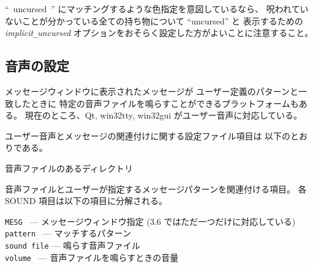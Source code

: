 ``~uncursed~'' にマッチングするような色指定を意図しているなら、
呪われていないことが分かっている全ての持ち物について ``uncursed'' と
表示するための
{\it implicit\verb+_+uncursed\/}
オプションをおそらく設定した方がよいことに注意すること。

\subsection*{音声の設定}

メッセージウィンドウに表示されたメッセージが
ユーザー定義のパターンと一致したときに
特定の音声ファイルを鳴らすことができるプラットフォームもある。
現在のところ、Qt, win32tty, win32gui がユーザー音声に対応している。

ユーザー音声とメッセージの関連付けに関する設定ファイル項目は
以下のとおりである。

\blist{}
\item[\ib{SOUNDDIR}]
音声ファイルのあるディレクトリ
\item[\ib{SOUND}]
音声ファイルとユーザーが指定するメッセージパターンを関連付ける項目。
各 SOUND 項目は以下の項目に分解される。

{\tt MESG      } --- メッセージウィンドウ指定 (3.6 ではただ一つだけに対応している)\\
{\tt pattern   } --- マッチするパターン\\
{\tt sound file} --- 鳴らす音声ファイル\\
{\tt volume    } --- 音声ファイルを鳴らすときの音量
\elist

